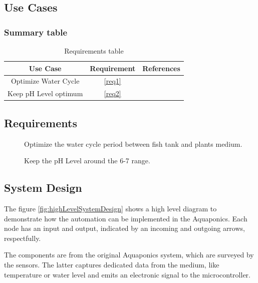 \subsection{Use Cases}
\label{sec:useCases}



\subsubsection{Summary table}

\begin{table}[h]
\centering
\caption{Requirements table}
\label{tab:requirementsTable}
\begin{tabular}{|c|c|c|}
\hline
\textbf{Use Case}    & \textbf{Requirement} & \textbf{References} \\ \hline
Optimize Water Cycle & \ref{req1}           &                 \\ \hline
Keep pH Level optimum & \ref{req2}           &  \cite{tables} \\ \hline
\end{tabular}
\end{table}

\subsection{Requirements}
\label{sec:requirements}

\begin{description}

\item []
Optimize the water cycle period between fish tank and plants medium.

\item []
Keep the pH Level around the 6-7 range.

\end{description}

\subsection{System Design}
\label{sec:design}

The figure \ref{fig:highLevelSystemDesign} shows a high level diagram to demonstrate how the automation can be implemented in the Aquaponics.
Each node has an input and output,
indicated by an incoming and outgoing arrows, respectfully.

The components are from the original Aquaponics system,
which are surveyed by the sensors.
The latter captures dedicated data from the medium,
like temperature or water level and emits an electronic signal to the microcontroller.

